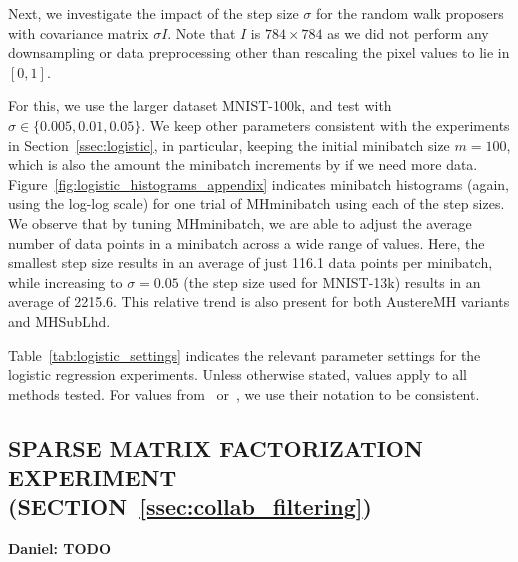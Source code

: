 \documentclass[letterpaper]{article}
\begin{document}
Next, we investigate the impact of the step size $\sigma$ for the random walk
proposers with covariance matrix $\sigma I$. Note that $I$ is $784\times 784$ as
we did not perform any downsampling or data preprocessing other than rescaling
the pixel values to lie in $[0,1]$.

For this, we use the larger dataset MNIST-100k, and test with $\sigma \in
\{0.005, 0.01, 0.05\}$. We keep other parameters consistent with the experiments
in Section~\ref{ssec:logistic}, in particular, keeping the initial minibatch
size $m=100$, which is also the amount the minibatch increments by if we need
more data. Figure~\ref{fig:logistic_histograms_appendix} indicates minibatch
histograms (again, using the log-log scale) for one trial of {\sc MHminibatch}
using each of the step sizes. We observe that by tuning {\sc MHminibatch}, we
are able to adjust the average number of data points in a minibatch across a
wide range of values. Here, the smallest step size results in an average of just
116.1 data points per minibatch, while increasing to $\sigma=0.05$ (the step
size used for MNIST-13k) results in an average of 2215.6. This relative trend is
also present for both {\sc AustereMH} variants and {\sc MHSubLhd}.

Table~\ref{tab:logistic_settings} indicates the relevant parameter settings for
the logistic regression experiments. Unless otherwise stated, values apply to
all methods tested. For values from~\citep{cutting_mh_2014}
or~\cite{icml2014c1_bardenet14}, we use their notation to be consistent.


\subsection{SPARSE MATRIX FACTORIZATION EXPERIMENT (SECTION~\ref{ssec:collab_filtering})}\label{app:collab_filtering}

\textbf{Daniel: TODO}
\end{document}
